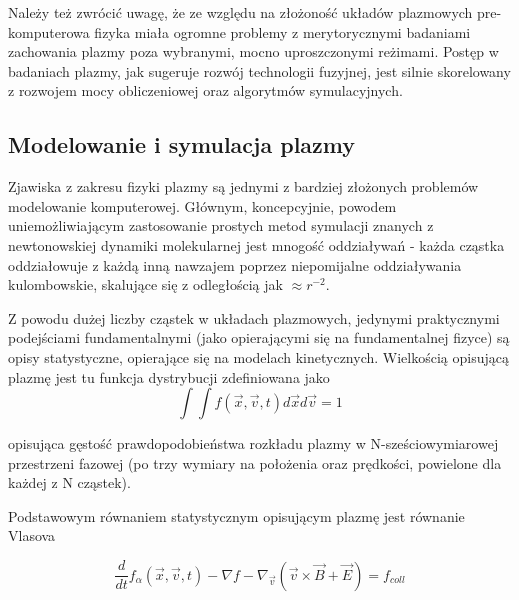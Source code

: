     Należy też zwrócić uwagę, że ze względu na złożoność układów plazmowych pre-komputerowa fizyka miała ogromne
    problemy z merytorycznymi badaniami zachowania plazmy poza wybranymi, mocno uproszczonymi reżimami. Postęp w badaniach
    plazmy, jak sugeruje rozwój technologii fuzyjnej, %
    jest silnie skorelowany %
    z rozwojem mocy obliczeniowej oraz algorytmów symulacyjnych.

    \subsection{Modelowanie i symulacja plazmy}

    Zjawiska z zakresu fizyki plazmy są jednymi z bardziej złożonych problemów modelowanie komputerowej.
    Głównym, koncepcyjnie, powodem uniemożliwiającym zastosowanie prostych metod symulacji
    znanych z newtonowskiej dynamiki molekularnej jest mnogość oddziaływań - każda cząstka oddziałowuje
    z każdą inną nawzajem poprzez niepomijalne oddziaływania kulombowskie, skalujące się z odległością jak
    $\approx r^{-2}$.

    Z powodu dużej liczby cząstek w układach plazmowych, jedynymi praktycznymi podejściami fundamentalnymi
    (jako opierającymi się na fundamentalnej fizyce) 
    są opisy statystyczne,
    opierające się na modelach kinetycznych. Wielkością opisującą plazmę jest tu funkcja dystrybucji zdefiniowana jako
    \begin{equation}
        \int \int f(\vec{x}, \vec{v}, t) d\vec{x} d\vec{v} = 1
        \label{eqn:distribution-function}
    \end{equation}

    opisująca gęstość prawdopodobieństwa rozkładu plazmy w N-sześciowymiarowej przestrzeni fazowej (po trzy wymiary na położenia
    oraz prędkości, powielone dla każdej z N cząstek).

    Podstawowym równaniem statystycznym opisującym plazmę jest równanie Vlasova 

    \begin{equation}
        \frac{d} {dt} f_{\alpha} (\vec{x}, \vec{v}, t) - \nabla f - \nabla_{\vec{v}} (\vec{v} \times \vec{B} + \vec{E})= f_{coll}
        \label{eqn:Vlasov}
    \end{equation}

